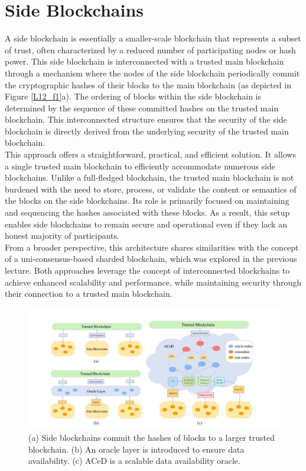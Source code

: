 \section{Side Blockchains}
A side blockchain is essentially a smaller-scale blockchain that represents a subset of trust, often characterized by a reduced number of participating nodes or hash power. This side blockchain is interconnected with a trusted main blockchain through a mechanism where the nodes of the side blockchain periodically commit the cryptographic hashes of their blocks to the main blockchain (as depicted in Figure \ref{L12_f1}a). The ordering of blocks within the side blockchain is determined by the sequence of these committed hashes on the trusted main blockchain. This interconnected structure ensures that the security of the side blockchain is directly derived from the underlying security of the trusted main blockchain.\\
This approach offers a straightforward, practical, and efficient solution. It allows a single trusted main blockchain to efficiently accommodate numerous side blockchains. Unlike a full-fledged blockchain, the trusted main blockchain is not burdened with the need to store, process, or validate the content or semantics of the blocks on the side blockchains. Its role is primarily focused on maintaining and sequencing the hashes associated with these blocks. As a result, this setup enables side blockchains to remain secure and operational even if they lack an honest majority of participants. \\
From a broader perspective, this architecture shares similarities with the concept of a uni-consensus-based sharded blockchain, which was explored in the previous lecture. Both approaches leverage the concept of interconnected blockchains to achieve enhanced scalability and performance, while maintaining security through their connection to a trusted main blockchain.
\begin{center}
	\begin{figure}
		\centering
		\includegraphics[width=0.8\linewidth]{Fig/12/F1}
		\caption{(a) Side blockchains commit the hashes of blocks to a larger trusted blockchain. (b) An oracle layer is introduced to ensure data availability. (c) ACeD is a scalable data availability oracle.
		}
		\label{fig:L12_f1}
	\end{figure}
\end{center}
